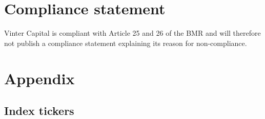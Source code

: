 \documentclass{article}
\begin{document}






\section{Compliance statement}
Vinter Capital is compliant with Article 25 and 26 of the BMR and will therefore not publish a compliance statement explaining its reason for non-compliance.


\pagebreak 

\section{Appendix}

\subsection{Index tickers}


\end{document}
